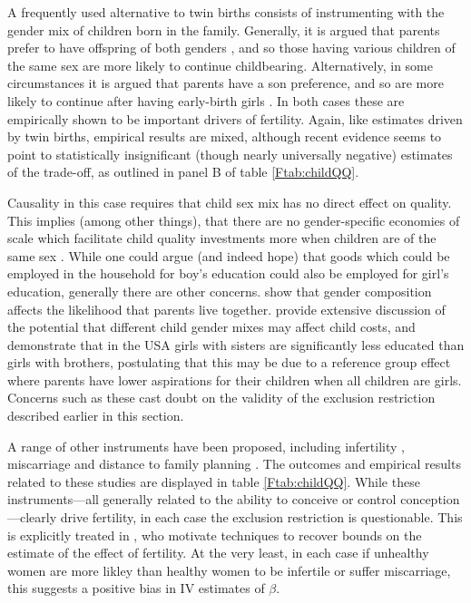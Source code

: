 \documentclass{article}
\begin{document}
\begin{spacing}{1.4}
A frequently used alternative to twin births consists of instrumenting with the 
gender mix of children born in the family. Generally, it is argued that parents
prefer to have offspring of both genders \citep{ConleyGlauber2006,Angristetal2010,
Beckeretal2010,MillimetWang2011,FitzsimonsMalde2014}, and so those having various 
children of the same sex are more likely to continue childbearing. Alternatively, 
in some circumstances it is argued that parents have a son preference, and so are 
more likely to continue after having early-birth girls \citep{Lee2008,
KumarKugler2011}. In both cases these are empirically shown to be important 
drivers of fertility.  Again, like estimates driven by twin births, empirical 
results are mixed, although recent evidence seems to point to statistically 
insignificant (though nearly universally negative) estimates of the trade-off, 
as outlined in panel B of table \ref{Ftab:childQQ}.

Causality in this case requires that child sex mix has no direct effect on 
quality.  This implies (among other things), that there are no gender-specific 
economies of scale which facilitate child quality investments more when children
are of the same sex \citep{ButcherCase1994}.  While one could argue (and indeed
hope) that goods which could be employed in the household for boy's education 
could also be employed for girl's education, generally there are other concerns.
\citet{DahlMoretti2008} show that gender composition affects the likelihood that
parents live together. \citet{ButcherCase1994} provide extensive discussion of 
the potential that different child gender mixes may affect child costs, and 
demonstrate that in the USA girls with sisters are significantly less educated 
than girls with brothers, postulating that this may be due to a reference group 
effect where parents have lower aspirations for their children when all children 
are girls. Concerns such as these cast doubt on the validity of the exclusion 
restriction described earlier in this section.

A range of other instruments have been proposed, including infertility
\citep{Bougmaetal2015}, miscarriage \citep{Hotzetal1997,Marlani2008,Miller2009}
and distance to family planning \citep{DangRogers2013}. The outcomes and 
empirical results related to these studies are displayed in table 
\ref{Ftab:childQQ}.  While these instruments---all generally related to the 
ability to conceive or control conception---clearly drive fertility, in each 
case the exclusion restriction is questionable.  This is explicitly treated in
\citet{Hotzetal1997}, who motivate techniques to recover bounds on the estimate
of the effect of fertility.  At the very least, in each case if unhealthy
women are more likley than healthy women to be infertile or suffer miscarriage,
this suggests a positive bias in IV estimates of $\beta$.


\end{spacing}
\end{document}
